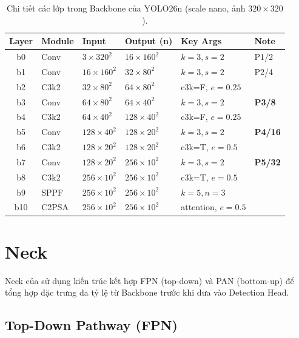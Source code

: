 \begin{table}[H]
\centering
\small
\caption{Chi tiết các lớp trong Backbone của YOLO26n (scale nano, ảnh $320\times320$).}
\label{tab:backbone_layers}
\begin{tabular}{clllll}
\toprule
\textbf{Layer} & \textbf{Module} & \textbf{Input} & \textbf{Output (n)} & \textbf{Key Args} & \textbf{Note} \\
\midrule
b0  & Conv   & $3\times320^2$ & $16\times160^2$ & $k\!=\!3, s\!=\!2$ & P1/2 \\
b1  & Conv   & $16\times160^2$ & $32\times80^2$ & $k\!=\!3, s\!=\!2$ & P2/4 \\
b2  & C3k2   & $32\times80^2$ & $64\times80^2$ & c3k=F, $e\!=\!0.25$ & \\
b3  & Conv   & $64\times80^2$ & $64\times40^2$ & $k\!=\!3, s\!=\!2$ & \textbf{P3/8} \\
b4  & C3k2   & $64\times40^2$ & $128\times40^2$ & c3k=F, $e\!=\!0.25$ & \\
b5  & Conv   & $128\times40^2$ & $128\times20^2$ & $k\!=\!3, s\!=\!2$ & \textbf{P4/16} \\
b6  & C3k2   & $128\times20^2$ & $128\times20^2$ & c3k=T, $e\!=\!0.5$ & \\
b7  & Conv   & $128\times20^2$ & $256\times10^2$ & $k\!=\!3, s\!=\!2$ & \textbf{P5/32} \\
b8  & C3k2   & $256\times10^2$ & $256\times10^2$ & c3k=T, $e\!=\!0.5$ & \\
b9  & SPPF   & $256\times10^2$ & $256\times10^2$ & $k\!=\!5, n\!=\!3$ & \\
b10 & C2PSA  & $256\times10^2$ & $256\times10^2$ & attention, $e\!=\!0.5$ & \\
\bottomrule
\end{tabular}
\end{table}

\section{Neck}
\label{sec:arch_neck}

Neck của \yolo sử dụng kiến trúc kết hợp FPN (top-down) và PAN (bottom-up) để tổng hợp đặc trưng đa tỷ lệ từ Backbone trước khi đưa vào Detection Head.

\subsection{Top-Down Pathway (FPN)}

